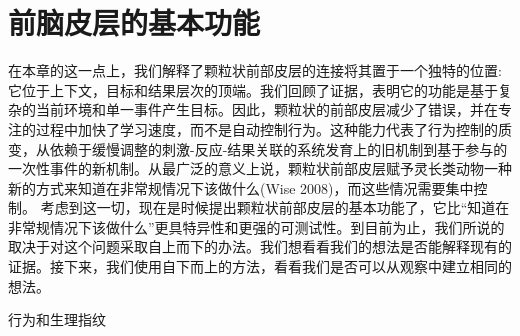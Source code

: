 \section{前脑皮层的基本功能}
在本章的这一点上，我们解释了颗粒状前部皮层的连接将其置于一个独特的位置:它位于上下文，目标和结果层次的顶端。我们回顾了证据，表明它的功能是基于复杂的当前环境和单一事件产生目标。因此，颗粒状的前部皮层减少了错误，并在专注的过程中加快了学习速度，而不是自动控制行为。这种能力代表了行为控制的质变，从依赖于缓慢调整的刺激-反应-结果关联的系统发育上的旧机制到基于参与的一次性事件的新机制。从最广泛的意义上说，颗粒状前部皮层赋予灵长类动物一种新的方式来知道在非常规情况下该做什么(Wise 2008)，而这些情况需要集中控制。
考虑到这一切，现在是时候提出颗粒状前部皮层的基本功能了，它比“知道在非常规情况下该做什么”更具特异性和更强的可测试性。到目前为止，我们所说的取决于对这个问题采取自上而下的办法。我们想看看我们的想法是否能解释现有的证据。接下来，我们使用自下而上的方法，看看我们是否可以从观察中建立相同的想法。

行为和生理指纹

